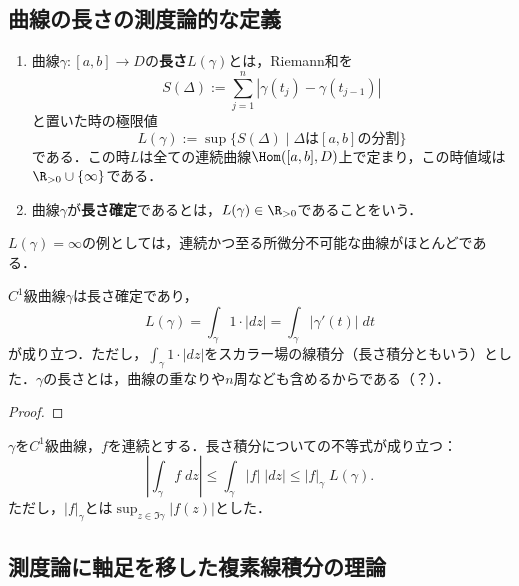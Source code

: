 \documentclass[uplatex, dvipdfmx]{jsreport}
\begin{document}
\subsection{曲線の長さの測度論的な定義}

\begin{definition}\mbox{}
    \begin{enumerate}
        \item 曲線$\gamma:[a,b]\to D$の\textbf{長さ}$L(\gamma)$とは，Riemann和を
        \[ S(\Delta):=\sum^n_{j=1}|\gamma(t_j)-\gamma(t_{j-1})| \]
        と置いた時の極限値
        \[ L(\gamma):=\sup\{S(\Delta)\mid \Delta は[a,b]の分割\} \]
        である．この時$L$は全ての連続曲線$\Hom([a,b],D)$上で定まり，この時値域は$\R_{>0}\cup\{\infty\}$である．
        \item 曲線$\gamma$が\textbf{長さ確定}であるとは，$L(\gamma)\in\R_{>0}$であることをいう．
    \end{enumerate}
\end{definition}

\begin{example}
    $L(\gamma)=\infty$の例としては，連続かつ至る所微分不可能な曲線がほとんどである．
\end{example}

\begin{theorem}[1-形式の方法とRiemann和の方法との等価性]\label{thm-C1-length-definedness}
    $C^1$級曲線$\gamma$は長さ確定であり，
    \[ L(\gamma)=\int_{\gamma}1\cdot|dz|=\int_{\gamma}|\gamma'(t)|\; dt \]
    が成り立つ．ただし，$\int_\gamma 1\cdot|dz|$をスカラー場の線積分（長さ積分ともいう）とした．$\gamma$の長さとは，曲線の重なりや$n$周なども含めるからである（？）．
\end{theorem}
\begin{proof}
    
\end{proof}

\begin{lemma}\label{lemma-triangular-inequality-in-infinite-cardinal}
    $\gamma$を$C^1$級曲線，$f$を連続とする．長さ積分についての不等式が成り立つ：
    \[  \left|\int_\gamma f\;dz\right|\le\int_\gamma|f|\;|dz|\le |f|_\gamma\;L(\gamma). \]
    ただし，$|f|_\gamma$とは$\sup_{z\in\Im\gamma}|f(z)|$とした．
\end{lemma}

\subsection{測度論に軸足を移した複素線積分の理論}
\end{document}
